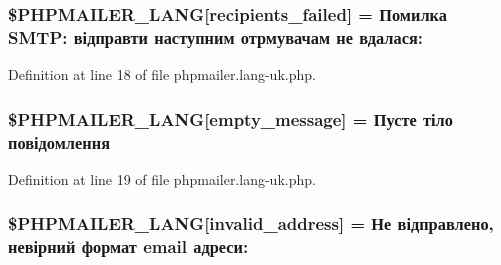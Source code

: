 \subsubsection[{\texorpdfstring{\$\+P\+H\+P\+M\+A\+I\+L\+E\+R\+\_\+\+L\+A\+NG}{$PHPMAILER_LANG}}]{\setlength{\rightskip}{0pt plus 5cm}\$P\+H\+P\+M\+A\+I\+L\+E\+R\+\_\+\+L\+A\+NG\mbox{[}\textquotesingle{}recipients\+\_\+failed\textquotesingle{}\mbox{]} = \textquotesingle{}Помилка S\+M\+T\+P\+: відправти наступним отрмувачам не вдалася\+: \textquotesingle{}}\hypertarget{phpmailer_8lang-uk_8php_a7589d30bb9b368327c2df015f3e6bcba}{}\label{phpmailer_8lang-uk_8php_a7589d30bb9b368327c2df015f3e6bcba}


Definition at line 18 of file phpmailer.\+lang-\/uk.\+php.

\subsubsection[{\texorpdfstring{\$\+P\+H\+P\+M\+A\+I\+L\+E\+R\+\_\+\+L\+A\+NG}{$PHPMAILER_LANG}}]{\setlength{\rightskip}{0pt plus 5cm}\$P\+H\+P\+M\+A\+I\+L\+E\+R\+\_\+\+L\+A\+NG\mbox{[}\textquotesingle{}empty\+\_\+message\textquotesingle{}\mbox{]} = \textquotesingle{}Пусте тіло повідомлення\textquotesingle{}}\hypertarget{phpmailer_8lang-uk_8php_a33772099f637c9d6c2cd7425e0e37fed}{}\label{phpmailer_8lang-uk_8php_a33772099f637c9d6c2cd7425e0e37fed}


Definition at line 19 of file phpmailer.\+lang-\/uk.\+php.

\subsubsection[{\texorpdfstring{\$\+P\+H\+P\+M\+A\+I\+L\+E\+R\+\_\+\+L\+A\+NG}{$PHPMAILER_LANG}}]{\setlength{\rightskip}{0pt plus 5cm}\$P\+H\+P\+M\+A\+I\+L\+E\+R\+\_\+\+L\+A\+NG\mbox{[}\textquotesingle{}invalid\+\_\+address\textquotesingle{}\mbox{]} = \textquotesingle{}Не відправлено, невірний формат {\bf email} адреси\+: \textquotesingle{}}\hypertarget{phpmailer_8lang-uk_8php_a42d61bcea4c79599ecb44fd062f54d47}{}\label{phpmailer_8lang-uk_8php_a42d61bcea4c79599ecb44fd062f54d47}


